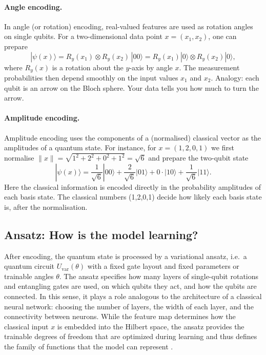 \documentclass[12pt,a4paper,openany]{report}
\let\parencite\citep
\begin{document}
\paragraph{Angle encoding.}
In angle (or rotation) encoding, real-valued features are used as rotation angles on
single qubits. For a two-dimensional data point $x = (x_1,x_2)$, one can prepare
\[
    |\psi(x)\rangle
    = R_y(x_1)\otimes R_y(x_2)\,|00\rangle
    = R_y(x_1)|0\rangle \otimes R_y(x_2)|0\rangle ,
\]
where $R_y(x)$ is a rotation about the $y$-axis by angle $x$. The measurement
probabilities then depend smoothly on the input values $x_1$ and $x_2$. Analogy: each qubit is an arrow on the Bloch sphere. Your data tells you how much to turn the arrow.

\paragraph{Amplitude encoding.}
Amplitude encoding uses the components of a (normalised) classical vector as the
amplitudes of a quantum state. For instance, for $x = (1,2,0,1)$ we first normalise
$\|x\| = \sqrt{1^2 + 2^2 + 0^2 + 1^2} = \sqrt{6}$ and prepare the two-qubit state
\[
    |\psi(x)\rangle
    = \frac{1}{\sqrt{6}}|00\rangle
      + \frac{2}{\sqrt{6}}|01\rangle
      + 0\cdot|10\rangle
      + \frac{1}{\sqrt{6}}|11\rangle .
\]
Here the classical information is encoded directly in the probability amplitudes of
each basis state. The classical numbers (1,2,0,1) decide how likely each basis state is, after the normalisation.

\subsection{Ansatz: How is the model learning?}

After encoding, the quantum state is processed by a variational ansatz, 
i.e.\ a quantum circuit \(U_{\mathrm{var}}(\theta)\) with a fixed gate
layout and fixed parameters or trainable angles \(\theta\). The ansatz specifies how many layers of
single-qubit rotations and entangling gates are used, on which qubits they act,
and how the qubits are connected. In this sense, it plays a role analogous to
the architecture of a classical neural network: choosing the number of layers,
the width of each layer, and the connectivity between neurons. While the feature
map determines how the classical input \(x\) is embedded into the Hilbert space,
the ansatz provides the trainable degrees of freedom that are optimized during
learning and thus defines the family of functions that the model
can represent \parencite{benedetti2019parameterized}.
\end{document}
